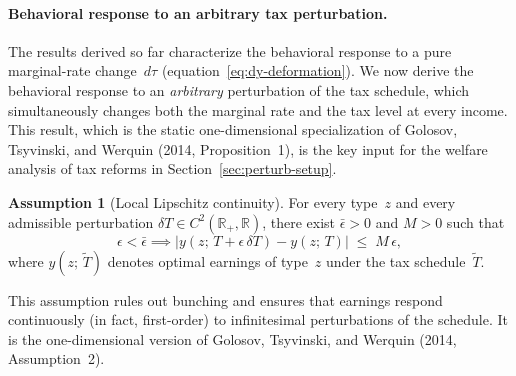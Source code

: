 \documentclass[12pt,a4paper]{article}
\theoremstyle{definition}
\newtheorem{assumption}{Assumption}[section]
\theoremstyle{plain}
\theoremstyle{remark}
\newcommand{\R}{\mathbb{R}}
\begin{document}
\paragraph{Behavioral response to an arbitrary tax perturbation.}
\label{par:arbitrary-perturbation}

The results derived so far characterize the behavioral response to a pure marginal-rate change~$d\tau$ (equation~\eqref{eq:dy-deformation}).  We now derive the behavioral response to an \emph{arbitrary} perturbation of the tax schedule, which simultaneously changes both the marginal rate and the tax level at every income.  This result, which is the static one-dimensional specialization of Golosov, Tsyvinski, and Werquin (2014, Proposition~1), is the key input for the welfare analysis of tax reforms in Section~\ref{sec:perturb-setup}.

\begin{assumption}[Local Lipschitz continuity]
\label{as:lipschitz}
For every type~$z$ and every admissible perturbation $\delta T \in C^2(\R_+,\R)$, there exist $\bar\epsilon > 0$ and $M > 0$ such that
\[
  \epsilon < \bar\epsilon \implies |y(z;\,T + \epsilon\,\delta T) - y(z;\,T)| \;\le\; M\,\epsilon,
\]
where $y(z;\,\tilde T)$ denotes optimal earnings of type~$z$ under the tax schedule~$\tilde T$.
\end{assumption}

\noindent
This assumption rules out bunching and ensures that earnings respond continuously (in fact, first-order) to infinitesimal perturbations of the schedule.  It is the one-dimensional version of Golosov, Tsyvinski, and Werquin (2014, Assumption~2).
\end{document}
